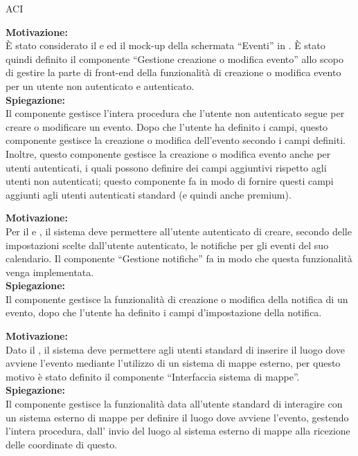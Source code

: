 \begin{listaPersonale}{ACI}


    \textbf{Motivazione:}\\
    È stato considerato il  e  ed il mock-up della schermata “Eventi” in .
    È stato quindi definito il componente “Gestione creazione o modifica evento” allo scopo di gestire la parte di front-end della funzionalità di creazione o modifica evento per un utente non autenticato e autenticato. \\
    \textbf{Spiegazione:}\\
    Il componente gestisce l'intera procedura che l'utente non autenticato segue per creare o modificare un evento. Dopo che l'utente ha definito i campi, questo componente gestisce la creazione o modifica dell'evento secondo i campi definiti. Inoltre, questo componente gestisce la creazione o modifica evento anche per utenti autenticati, i quali possono definire dei campi aggiuntivi rispetto agli utenti non autenticati; questo componente fa in modo di fornire questi campi aggiunti agli utenti autenticati standard (e quindi anche premium).



    \textbf{Motivazione:}\\
    Per il  e , il sistema deve permettere all'utente autenticato di creare, secondo delle impostazioni scelte dall'utente autenticato, le notifiche per gli eventi del suo calendario. Il componente “Gestione notifiche” fa in modo che questa funzionalità venga implementata. \\
    \textbf{Spiegazione:} \\Il componente gestisce la funzionalità di creazione o modifica della notifica di un evento, dopo che l'utente ha definito i campi d'impostazione della notifica.



    \textbf{Motivazione:}\\
    Dato il , il sistema deve permettere agli utenti standard di inserire il luogo dove avviene l'evento mediante l'utilizzo di un sistema di mappe esterno, per questo motivo è stato definito il componente “Interfaccia sistema di mappe”. \\
    \textbf{Spiegazione:} \\Il componente gestisce la funzionalità data all'utente standard di interagire con un sistema esterno di mappe per definire il luogo dove avviene l'evento, gestendo l'intera procedura, dall' invio del luogo al sistema esterno di mappe alla ricezione delle coordinate di questo.



\end{listaPersonale}
